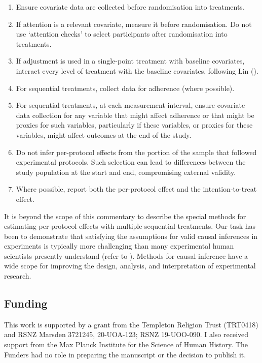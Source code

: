 \documentclass[
  single column]{article}
\providecommand{\tightlist}{%
  \setlength{\itemsep}{0pt}\setlength{\parskip}{0pt}}\usepackage{longtable,booktabs,array}
\begin{document}
\begin{enumerate}
\def\labelenumi{\arabic{enumi}.}
\tightlist
\item
  Ensure covariate data are collected before randomisation into
  treatments.
\item
  If attention is a relevant covariate, measure it before randomisation.
  Do not use `attention checks' to select participants after
  randomisation into treatments.
\item
  If adjustment is used in a single-point treatment with baseline
  covariates, interact every level of treatment with the baseline
  covariates, following Lin
  ().
\item
  For sequential treatments, collect data for adherence (where
  possible).
\item
  For sequential treatments, at each measurement interval, ensure
  covariate data collection for any variable that might affect adherence
  or that might be proxies for such variables, particularly if these
  variables, or proxies for these variables, might affect outcomes at
  the end of the study.
\item
  Do not infer per-protocol effects from the portion of the sample that
  followed experimental protocols. Such selection can lead to
  differences between the study population at the start and end,
  compromising external validity.
\item
  Where possible, report both the per-protocol effect and the
  intention-to-treat effect.
\end{enumerate}

It is beyond the scope of this commentary to describe the special
methods for estimating per-protocol effects with multiple sequential
treatments. Our task has been to demonstrate that satisfying the
assumptions for valid causal inferences in experiments is typically more
challenging than many experimental human scientists presently understand
(refer to ).
Methods for causal inference have a wide scope for improving the design,
analysis, and interpretation of experimental research.

\newpage{}

\subsection{Funding}\label{funding}

This work is supported by a grant from the Templeton Religion Trust
(TRT0418) and RSNZ Marsden 3721245, 20-UOA-123; RSNZ 19-UOO-090. I also
received support from the Max Planck Institute for the Science of Human
History. The Funders had no role in preparing the manuscript or the
decision to publish it.
\end{document}
